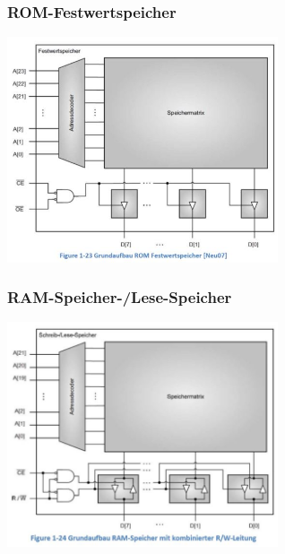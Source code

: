 \begin{multicols}{2}
    \subsubsection{ROM-Festwertspeicher}
    \includegraphics[width=8cm]{images/ROM}
    
    \subsubsection{RAM-Speicher-/Lese-Speicher}
    \includegraphics[width=8cm]{images/RAM}
\end{multicols}

